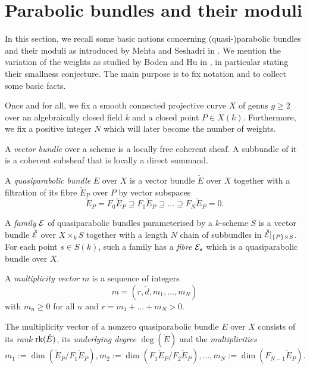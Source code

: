 \documentclass{article}
\begin{document}
\section{Parabolic bundles and their moduli} \label{moduli}
In this section, we recall some basic notions concerning (quasi-)parabolic bundles and their moduli as introduced by Mehta and
Seshadri in \cite{mehta}. We mention the variation of the weights as studied by Boden and Hu in \cite{boden}, in particular stating
their smallness conjecture. The main purpose is to fix notation and to collect some basic facts.

Once and for all, we fix a smooth connected projective curve $X$ of genus $g \geq 2$ over an algebraically closed field $k$
and a closed point $P \in X(k)$. Furthermore, we fix a positive integer $N$ which will later become the number of weights.

A \emph{vector bundle} over a scheme is a locally free coherent sheaf. A subbundle of it is a coherent subsheaf that is locally a direct summand.
\begin{defn}
  A \emph{quasiparabolic bundle} $E$ over $X$ is a vector bundle $\check{E}$ over $X$ together with a filtration of its fibre
  $\check{E}_P$ over $P$ by vector subspaces
  \begin{displaymath}
    \check{E}_P = F_0 \check{E}_P \supseteq F_1 \check{E}_P \supseteq \ldots \supseteq F_N \check{E}_P = 0.
  \end{displaymath}
\end{defn}

A \emph{family} $\mathcal{E}$ of quasiparabolic bundles parameterised by a $k$-scheme $S$ is a vector bundle $\check{\mathcal{E}}$ over $X \times_k S$ together with a
length $N$ chain of subbundles in $\check{\mathcal{E}}|_{\{P\} \times S}$. For each point $s \in S(k)$, such a family has a \emph{fibre} $\mathcal{E}_s$ which is a
quasiparabolic bundle over $X$.

\begin{defn} \label{mult_vector}
  A \emph{multiplicity vector} $m$ is a sequence of integers
  \begin{displaymath}
    m = (r, \check{d}, m_1, \ldots, m_N)
  \end{displaymath}
  with $m_n \geq 0$ for all $n$ and $r = m_1 + \ldots + m_N > 0$.
\end{defn}

The multiplicity vector of a nonzero quasiparabolic bundle $E$ over $X$ consists of its \emph{rank} $\mathrm{rk}(\check{E})$, its \emph{underlying degree}
$\deg(\check{E})$ and the \emph{multiplicities}
\begin{displaymath}
  m_1 := \dim(\check{E}_P/F_1 \check{E}_P), m_2 := \dim(F_1 \check{E}_P/F_2 \check{E}_P), \ldots, m_N := \dim(F_{N-1} \check{E}_P).
\end{displaymath}
\end{document}
